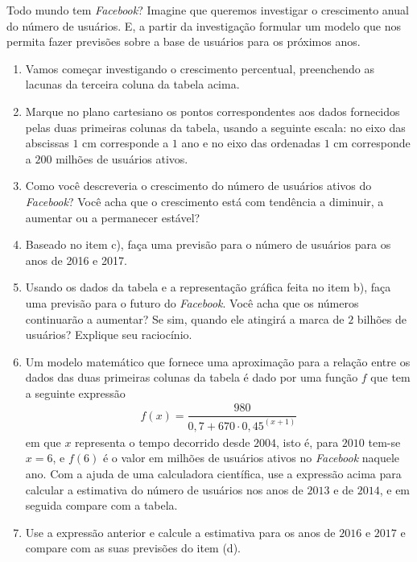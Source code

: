 \documentclass[extrafontsizes, twoside, 11pt, openright, final]{memoir}
\begin{document}
\begin{task}{ Todo mundo tem \emph{Facebook}?}
	Imagine que queremos investigar o crescimento anual do número de usuários. E, a partir da investigação formular um modelo que nos permita fazer previsões sobre a base de usuários para os próximos anos.
	\begin{enumerate}
		\item Vamos começar investigando o crescimento percentual, preenchendo as lacunas da terceira coluna da tabela acima.

		\item Marque no plano cartesiano os pontos correspondentes aos dados fornecidos pelas duas primeiras colunas da tabela, usando a seguinte escala: no eixo das abscissas $1$ cm corresponde a $1$ ano e no eixo das ordenadas $1$ cm corresponde a $200$ milhões de usuários ativos.

		\item Como você descreveria o crescimento do número de usuários ativos do \emph{Facebook}? Você acha que o crescimento está com tendência a diminuir, a aumentar ou a permanecer estável?

		\item Baseado no item c), faça uma previsão para o número de usuários para os anos de 2016 e 2017.

		\item Usando os dados da tabela e a representação gráfica feita no item b), faça uma previsão para o futuro do \emph{Facebook}. Você acha que os números continuarão a aumentar? Se sim, quando ele atingirá a marca de $2$ bilhões de usuários? Explique seu raciocínio.

		\item Um modelo matemático que fornece uma aproximação para a relação entre os dados das duas primeiras colunas da tabela é dado por uma função $f$ que tem a seguinte expressão
		      \begin{equation*}
			      \begin{split}f(x)=\dfrac{980}{0,7+670 \cdot 0,45^{(x+1)}}\end{split}
		      \end{equation*}
		      em que $x$ representa o tempo decorrido desde $2004$, isto é, para $2010$ tem-se $x=6$, e $f(6)$ é o valor em milhões de usuários ativos no \emph{Facebook} naquele ano. Com a ajuda de uma calculadora científica, use a expressão acima para calcular a estimativa do número de usuários nos anos de $2013$ e de $2014$, e em seguida compare com a tabela.

		\item Use a expressão anterior e calcule a estimativa para os anos de $2016$ e $2017$ e compare com as suas previsões do item (d).


\end{enumerate}
\end{task}
\end{document}
